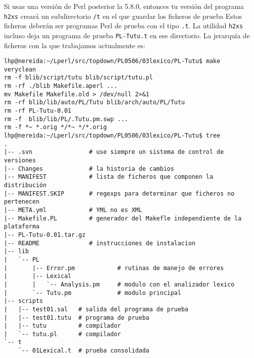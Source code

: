 Si usas una versión de Perl posterior  la 5.8.0, entonces tu versión del programa
\verb|h2xs| 
creará un subdirectorio \verb|/t| en el que guardar los ficheros de prueba
Estos ficheros deberán 
ser programas Perl de prueba con el tipo \verb|.t|. La utilidad
\verb|h2xs| incluso deja un programa de prueba \verb|PL-Tutu.t| en ese directorio.
La jerarquía de ficheros con la que trabajamos actualmente es:
\begin{verbatim}
lhp@nereida:~/Lperl/src/topdown/PL0506/03lexico/PL-Tutu$ make veryclean
rm -f blib/script/tutu blib/script/tutu.pl
rm -rf ./blib Makefile.aperl ...
mv Makefile Makefile.old > /dev/null 2>&1
rm -rf blib/lib/auto/PL/Tutu blib/arch/auto/PL/Tutu
rm -rf PL-Tutu-0.01
rm -f  blib/lib/PL/.Tutu.pm.swp ...
rm -f *~ *.orig */*~ */*.orig
lhp@nereida:~/Lperl/src/topdown/PL0506/03lexico/PL-Tutu$ tree
.
|-- .svn                # use siempre un sistema de control de versiones
|-- Changes             # la historia de cambios
|-- MANIFEST            # lista de ficheros que componen la distribución
|-- MANIFEST.SKIP       # regexps para determinar que ficheros no pertenecen
|-- META.yml            # YML no es XML
|-- Makefile.PL         # generador del Makefle independiente de la plataforma
|-- PL-Tutu-0.01.tar.gz
|-- README              # instrucciones de instalacion
|-- lib
|   `-- PL
|       |-- Error.pm            # rutinas de manejo de errores
|       |-- Lexical
|       |   `-- Analysis.pm     # modulo con el analizador lexico
|       `-- Tutu.pm             # modulo principal
|-- scripts
|   |-- test01.sal   # salida del programa de prueba
|   |-- test01.tutu  # programa de prueba
|   |-- tutu         # compilador
|   `-- tutu.pl      # compilador
`-- t
    `-- 01Lexical.t  # prueba consolidada
\end{verbatim}


